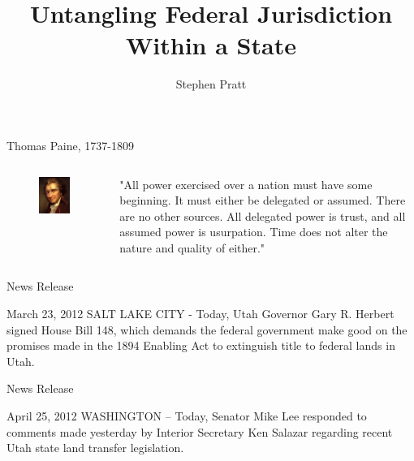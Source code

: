 




\title[Untangling Federal Jurisdiction]{Untangling Federal Jurisdiction Within a State}
\author{Stephen Pratt}

\frame{\titlepage}

\begin{frame}{Thomas Paine, 1737-1809}
    \begin{columns}[c]
        \column{2in}
            \begin{figure}[h]
                \includegraphics{img/thomas-paine.png}
            \end{figure}
        \column{1.5in}
            "All power exercised over a nation must have some beginning.  It must either be delegated or assumed.  There are no other sources.  All delegated power is trust, and all assumed power is usurpation.  Time does not alter the nature and quality of either."
    \end{columns}
\end{frame}

\begin{frame}{News Release}
    \begin{block}{March 23, 2012}
    SALT LAKE CITY - Today, Utah Governor Gary R. Herbert signed House Bill 148, which demands the federal government make good on the promises made in the 1894 Enabling Act to extinguish title to federal lands in Utah. 
    \end{block}
\end{frame}

\begin{frame}{News Release}
    \begin{block}{April 25, 2012}
    WASHINGTON – Today, Senator Mike Lee responded to comments made yesterday by Interior Secretary Ken Salazar regarding recent Utah state land transfer legislation.
    \end{block}
\end{frame}

